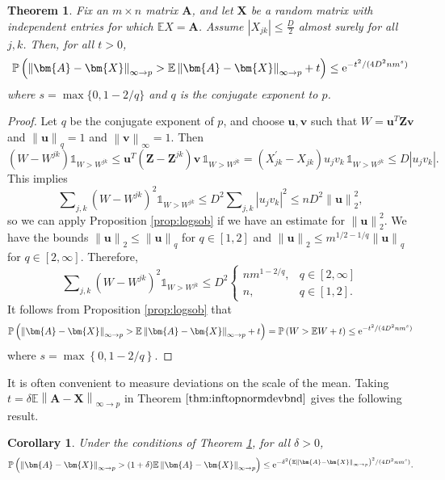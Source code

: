 \documentclass[11pt,letterpaper,twoside,reqno]{amsart}
\newcommand{\e}{\ensuremath{{\rm e}}}
\newcommand{\mat}[1]{\ensuremath{\bm{#1}}}
\newcommand{\E}{\ensuremath{\mathbb{E}}}
\newcommand{\Prob}[1]{\ensuremath{\mathbb{P}\left(#1\right)}}
\newcommand{\norm}[1]{\ensuremath{\left\|#1\right\|}}
\newtheorem{thm}{Theorem}
\newtheorem{cor}{Corollary}
\begin{document}
\begin{thm}
Fix an $m \times n$ matrix $\mat{A}$, and let $\mat{X}$ be a random matrix with independent entries for which $\E X = \mat{A}$. Assume $\left|X_{jk}\right|\leq\frac{D}{2}$ almost surely for all $j,k$. Then, for all $t>0$,
\[
\Prob{\norm{\mat{A}-\mat{X}}_{\infty\rightarrow p}> \E\norm{\mat{A}-\mat{X}}_{\infty\rightarrow p}+t}\leq \e^{-t^{2}/(4D^{2}nm^{s})}
\]
where $s=\max\{0, 1-2/q\}$ and $q$ is the conjugate exponent to $p$. 
\label{thm:inftopnormdevbnd}
\end{thm}

\begin{proof}
Let $q$ be the conjugate exponent of $p$, and choose $\mat{u},\mat{v}$ such that $W=\mat{u}^{T}\mat{Z}\mat{v}$ and $\norm{\mat{u}}_q = 1$ and $\norm{\mat{v}}_\infty = 1.$ Then 
\[
(W-W^{jk})\mathbb{1}_{W>W^{jk}}\leq\mat{u}^{T}\left(\mat{Z}-\mat{Z}^{jk}\right)\mat{v}\,\mathbb{1}_{W>W^{jk}}=(X_{jk}^{\prime}-X_{jk})u_{j}v_{k}\,\mathbb{1}_{W>W^{jk}}\leq D|u_{j}v_{k}|.
\]
This implies 
\[
\sum\nolimits_{j,k}(W-W^{jk})^{2}\mathbb{1}_{W>W^{jk}}\leq D^{2}\sum\nolimits_{j,k}|u_{j}v_{k}|^{2}\leq nD^{2}\norm{\mat{u}}_{2}^{2},
\]
so we can apply Proposition \ref{prop:logsob} if we have an estimate for $\norm{\mat{u}}_2^2$. We have the bounds $\norm{\mat{u}}_{2}\leq\norm{\mat{u}}_{q}$ for $q\in[1,2]$ and $\norm{\mat{u}}_{2}\leq m^{1/2-1/q}\norm{\mat{u}}_{q}$ for $q\in[2,\infty]$. Therefore,
\[
\sum\nolimits_{j,k}(W-W^{jk})^{2}\mathbb{1}_{W>W^{jk}}\leq D^{2}
\begin{cases}
nm^{1-2/q}, & q\in[2,\infty]\\
n, & q\in[1,2].
\end{cases}
\]
It follows from Proposition \ref{prop:logsob} that 
\[
\Prob{\norm{\mat{A}-\mat{X}}_{\infty\rightarrow p}>\E\norm{\mat{A} - \mat{X}}_{\infty\rightarrow p}+t}= \Prob{W>\E W+t}\leq \e^{-t^{2}/(4D^{2}nm^{s})}
\]
where $s=\max\left\{0,1-2/q\right\}.$
\end{proof}
It is often convenient to measure deviations on the scale of the mean. Taking $t=\delta \E\norm{\mat{A} - \mat{X}}_{\infty \rightarrow p}$ in Theorem $\ref{thm:inftopnormdevbnd}$ gives the following result.
\begin{cor}
Under the conditions of Theorem \ref{thm:inftopnormdevbnd}, for all $\delta>0$, 
\[
\Prob{\norm{\mat{A}-\mat{X}}_{\infty \rightarrow p}>(1 + \delta)\E\norm{\mat{A} - \mat{X}}_{\infty \rightarrow p}}\leq \e^{-\delta^{2}\left(\E\norm{\mat{A} - \mat{X}}_{\infty \rightarrow p}\right)^{2}/(4D^{2}nm^{s})}.
\]
\label{cor:inftopreldevbnd}
\end{cor}
\end{document}
